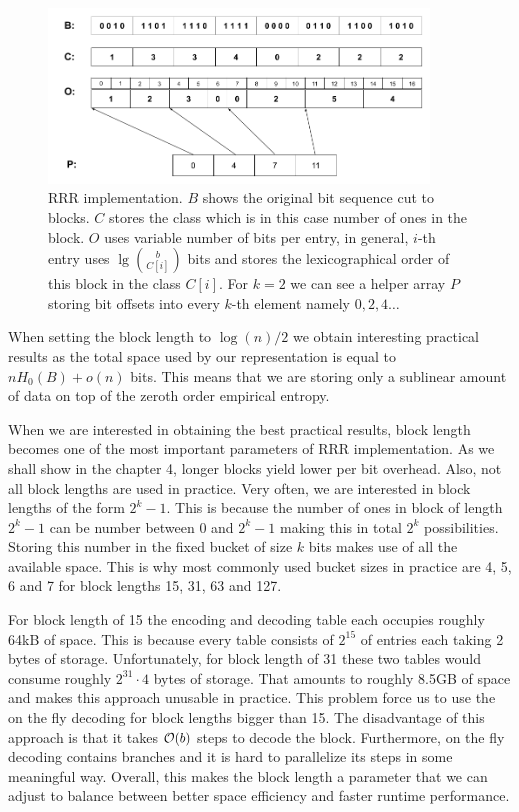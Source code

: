 \begin{figure}
	\centerline{
		\includegraphics[width=0.9\textwidth, height=0.3\textheight]{images/rrr}
	}
	\caption[TODO]{RRR implementation. $B$ shows the original bit sequence cut to
    blocks. $C$ stores the class which is in this case number of ones in the block.
    $O$ uses variable number of bits per entry, in general, $i$-th entry uses
    $\lg {b\choose C[i]}$ bits and stores the lexicographical order
    of this block in the class $C[i]$. For $k=2$ we can see a helper array $P$
    storing bit offsets into every $k$-th element namely $0, 2, 4\ldots$
	}
	\label{obr:RRRFinal}
\end{figure}

When setting the block length to $\log(n)/2$ we obtain interesting practical results as
the total space used by our representation is equal to $nH_0(B) + o(n)$ bits. This means
that we are storing only a sublinear amount of data on top of the zeroth order empirical entropy.

When we are interested in obtaining the best practical results, block length becomes
one of the most important parameters of RRR implementation. As we shall show in the chapter
4, longer blocks yield lower per bit overhead. Also, not all block
lengths are used in practice. Very often, we are interested in block lengths of the form $2^k-1$.
This is because the number of ones in block of length $2^k-1$ can be number between 0 and $2^k-1$
making this in total $2^k$ possibilities. Storing this number in the fixed bucket of size
$k$ bits makes use of all the available space. This is why most commonly used bucket sizes in
practice are 4, 5, 6 and 7 for block lengths 15, 31, 63 and 127.

For block length of 15 the encoding and decoding table each occupies roughly 64kB of space. This
is because every table consists of $2^{15}$ of entries each taking 2 bytes of storage. Unfortunately,
for block length of 31 these two tables would consume roughly $2^{31}\cdot 4$ bytes of storage. That
amounts to roughly 8.5GB of space and makes this approach unusable in practice. This problem force us
to use the on the fly decoding for block lengths bigger than 15. The disadvantage of this approach is
that it takes $\mathcal{O}(b)$ steps to decode the block. Furthermore, on the fly decoding contains branches
and it is hard to parallelize its steps in some meaningful way. Overall, this makes the block length a
parameter that we can adjust to balance between better space efficiency and faster runtime performance.